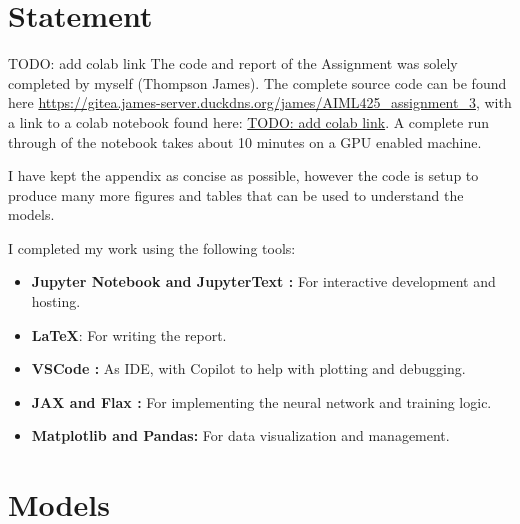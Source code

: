 \documentclass[conference,a4paper]{IEEEtran}
\begin{document}
\newpage
\section*{Statement}

TODO: add colab link
The code and report of the Assignment was solely completed by myself (Thompson James). The complete source code can be found here \url{https://gitea.james-server.duckdns.org/james/AIML425\_assignment\_3}, with a link to a colab notebook found here: \url{TODO: add colab link}. A complete run through of the notebook takes about 10 minutes on a GPU enabled machine.

I have kept the appendix as concise as possible, however the code is setup to produce many more figures and tables that can be used to understand the models.

I completed my work using the following tools:
\begin{itemize}
    \item \textbf{Jupyter Notebook \cite{Kluyver2016jupyter} and JupyterText \cite{woutsMwoutsJupytext2025}:} For interactive development and hosting.
    \item \textbf{\LaTeX}: For writing the report.
    \item \textbf{VSCode \cite{MicrosoftVscode2025}:} As IDE, with Copilot to help with plotting and debugging.
    \item \textbf{JAX \cite{jax2018github} and Flax \cite{flax2020github}:} For implementing the neural network and training logic.
    \item \textbf{Matplotlib\cite{Hunter:2007} and Pandas\cite{thepandasdevelopmentteamPandasdevPandasPandas}:} For data visualization and management.
\end{itemize}





\appendix

\section{Models}
\end{document}
